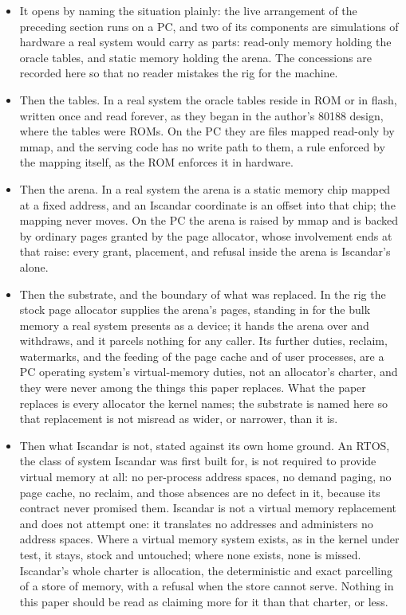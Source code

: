 \documentclass[11pt]{article}
\begin{document}
\begin{itemize}
\item It opens by naming the situation plainly: the live arrangement of the preceding section runs on a PC, and two of its components are simulations of hardware a real system would carry as parts: read-only memory holding the oracle tables, and static memory holding the arena. The concessions are recorded here so that no reader mistakes the rig for the machine.
\item Then the tables. In a real system the oracle tables reside in ROM or in flash, written once and read forever, as they began in the author's 80188 design, where the tables were ROMs. On the PC they are files mapped read-only by mmap, and the serving code has no write path to them, a rule enforced by the mapping itself, as the ROM enforces it in hardware.
\item Then the arena. In a real system the arena is a static memory chip mapped at a fixed address, and an Iscandar coordinate is an offset into that chip; the mapping never moves. On the PC the arena is raised by mmap and is backed by ordinary pages granted by the page allocator, whose involvement ends at that raise: every grant, placement, and refusal inside the arena is Iscandar's alone.
\item Then the substrate, and the boundary of what was replaced. In the rig the stock page allocator supplies the arena's pages, standing in for the bulk memory a real system presents as a device; it hands the arena over and withdraws, and it parcels nothing for any caller. Its further duties, reclaim, watermarks, and the feeding of the page cache and of user processes, are a PC operating system's virtual-memory duties, not an allocator's charter, and they were never among the things this paper replaces. What the paper replaces is every allocator the kernel names; the substrate is named here so that replacement is not misread as wider, or narrower, than it is.
\item Then what Iscandar is not, stated against its own home ground. An RTOS, the class of system Iscandar was first built for, is not required to provide virtual memory at all: no per-process address spaces, no demand paging, no page cache, no reclaim, and those absences are no defect in it, because its contract never promised them. Iscandar is not a virtual memory replacement and does not attempt one: it translates no addresses and administers no address spaces. Where a virtual memory system exists, as in the kernel under test, it stays, stock and untouched; where none exists, none is missed. Iscandar's whole charter is allocation, the deterministic and exact parcelling of a store of memory, with a refusal when the store cannot serve. Nothing in this paper should be read as claiming more for it than that charter, or less.

\end{itemize}
\end{document}
